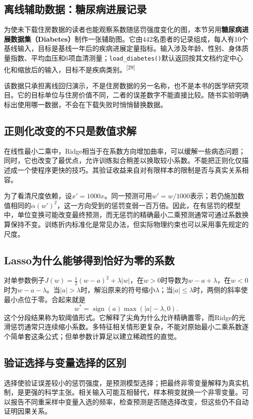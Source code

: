\subsection*{离线辅助数据：糖尿病进展记录}
为使未下载住房数据的读者也能观察系数随惩罚强度变化的图，本节另用\textbf{糖尿病进展数据集（Diabetes）}制作一张辅助图。它由442名患者的记录组成，每人有10个基线输入，目标是基线一年后的疾病进展定量指标。输入涉及年龄、性别、身体质量指数、平均血压和6项血清测量；\texttt{load\_diabetes()}默认返回按其文档约定中心化和缩放后的输入，目标不是疾病类别。\textsuperscript{[29]}

该数据只承担离线回归演示，不是住房数据的另一名称，也不是本书的医学研究项目。它的目标单位与住房价值不同，二者的误差数字不能直接比较。随书实验明确标出使用哪一数据，不会在下载失败时悄悄替换数据。



\subsection{正则化改变的不只是数值求解}
在线性最小二乘中，Ridge相当于在系数方向增加曲率，可以缓解一些病态问题；同时，它也改变了最优点，允许训练拟合稍差以换取较小系数。不能把正则化仅描述成一个使程序更快的技巧。其验证收益来自对有限样本的限制是否与真实关系相容。

为了看清尺度依赖，设$x'=1000x$。同一预测可用$w'=w/1000$表示；若仍施加数值相同的$\alpha(w')^2$，这一方向受到的惩罚变弱一百万倍。因此，在有惩罚的模型中，单位变换可能改变最终预测，而无惩罚的精确最小二乘预测通常可通过系数换算保持不变。训练折内标准化是常见办法，但实际物理约束也可以采用事先规定的尺度。

\subsection{Lasso为什么能够得到恰好为零的系数}
对单参数例子$J(w)=\tfrac12(w-a)^2+\lambda|w|$，在$w>0$时导数为$w-a+\lambda$，在$w<0$时为$w-a-\lambda$。当$|a|>\lambda$时，解沿原来的符号缩小$\lambda$；当$|a|\le\lambda$时，两侧的斜率使最小点位于零。合起来就是
\[
w^*=\operatorname{sign}(a)\max(|a|-\lambda,0).
\]
这个分段结果称为软阈值形式。它解释了尖角为什么允许精确置零，而Ridge的光滑惩罚通常只连续缩小系数。多特征相关情形更复杂，不能对原始最小二乘系数逐个简单套这条公式；但单参数计算足以建立稀疏性的直觉。

\subsection{验证选择与变量选择的区别}
选择使验证误差较小的惩罚强度，是预测模型选择；把最终非零变量解释为真实机制，是更强的科学主张。相关输入可能互相替代，样本稍变就换一个非零变量。可以报告不同重采样中变量入选的频率，检查预测是否随选择改变，但这些仍不自动证明因果关系。

